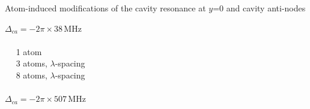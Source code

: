 \documentclass{beamer}
\begin{document}
\begin{frame}{Atom-induced modifications of the cavity resonance {\tiny at $y$=0 and cavity anti-nodes}}
\begin{minipage}{0.61\textwidth}
\begin{minipage}{0.47\textwidth}
		\end{minipage}
		\hspace{-1em}
		\begin{minipage}{0.42\textwidth}
			{\footnotesize$\Delta_{ca} = -2\pi\times38\,$MHz\\~\\
			\textcolor[rgb]{0.376, 0.376, 0.376}{~ ~1 atom}\\
			\textcolor[rgb]{0.725, 0.612, 0.243}{~ ~3 atoms, $\lambda$-spacing}\\
			\textcolor[rgb]{0.263, 0.588, 0.588}{~ ~8 atoms, $\lambda$-spacing}\\~\\
			\footnotesize$\Delta_{ca} = -2\pi\times507\,$MHz\\~}
		\end{minipage}
	\end{minipage}
\end{frame}
\end{document}
